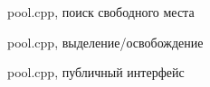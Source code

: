 \documentclass[unknownkeysallowed,xcolor=table]{beamer}
\makeatletter
\newcommand{\srcmediumsize}{\@setfontsize{\srcmediumsize}{7pt}{7pt}}
\newcommand{\srcbigsize}{\@setfontsize{\srcbigsize}{8pt}{8pt}}
\makeatother
\begin{document}
\begin{frame}[fragile]{pool.cpp, поиск свободного места}

\end{frame}

\begin{frame}[fragile]{pool.cpp, выделение/освобождение}

\end{frame}

\begin{frame}[fragile]{pool.cpp, публичный интерфейс}

\end{frame}
\end{document}
